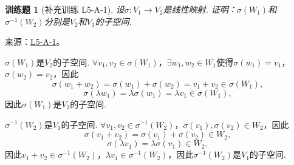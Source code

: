 \documentclass[12pt,fontset=fandol]{ctexart}
\newtheorem{exercise}{训练题}[section]
\begin{document}
\begin{exercise}[补充训练 L5-A-1]\label{prob:L5-A-1}
设$\sigma: V_1\to V_2$是线性映射. 证明：$\sigma(W_1)$和$\sigma^{-1}(W_2)$分别是$V_2$和$V_1$的子空间.
\end{exercise}
\noindent 来源：\href{https://github.com/yhwu-is/Linear-Algebra-Left-Undone/blob/new/%E8%AE%B2%E4%B9%89/%E4%B8%93%E9%A2%98/5%20%E7%BA%BF%E6%80%A7%E6%98%A0%E5%B0%84.tex}{L5-A-1}。
\begin{solve}
$\sigma(W_1)$是$V_2$的子空间. $\forall v_1,v_2\in\sigma(W_1)$，$\exists w_1,w_2\in W_1$使得$\sigma(w_1)=v_1$，$\sigma(w_2)=v_2$，因此
            \[\sigma(w_1+w_2)=\sigma(w_1)+\sigma(w_2)=v_1+v_2\in\sigma(W_1),\]
            \[\sigma(\lambda w_1)=\lambda\sigma(w_1)=\lambda v_1\in\sigma(W_1),\]
            因此$\sigma(W_1)$是$V_2$的子空间.

            $\sigma^{-1}(W_2)$是$V_1$的子空间. $\forall v_1,v_2\in\sigma^{-1}(W_2)$，$\sigma(v_1),\sigma(v_2)\in W_2$，因此
            \[\sigma(v_1+v_2)=\sigma(v_1)+\sigma(v_2)\in W_2,\]
            \[\sigma(\lambda v_1)=\lambda\sigma(v_1)\in W_2,\]
            因此$v_1+v_2\in\sigma^{-1}(W_2)$，$\lambda v_1\in\sigma^{-1}(W_2)$，因此$\sigma^{-1}(W_2)$是$V_1$的子空间.
\end{solve}
\end{document}
